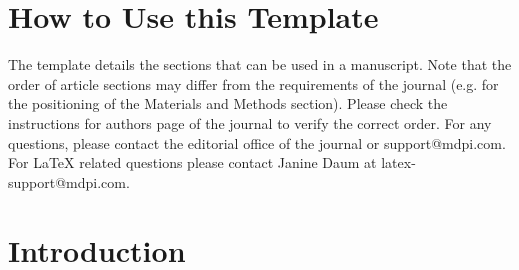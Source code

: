 \documentclass[sensors,article,submit,moreauthors,pdftex,10pt,a4paper]{mdpi}
\begin{document}

\setcounter{section}{-1} %
\section{How to Use this Template}
The template details the sections that can be used in a manuscript. Note that the order of article sections may differ from the requirements of the journal (e.g. for the positioning of the Materials and Methods section). Please check the instructions for authors page of the journal to verify the correct order. For any questions, please contact the editorial office of the journal or support@mdpi.com. For LaTeX related questions please contact Janine Daum at latex-support@mdpi.com.

\section{Introduction}
\end{document}

